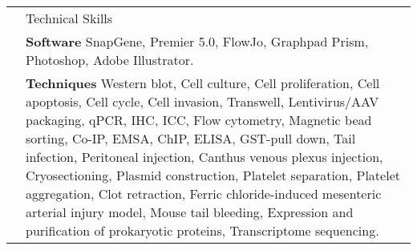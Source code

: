 \documentclass[letterpaper, 11pt]{article}
\newcommand{\headingfont}{\Large\color{LimeGreen}}
\newenvironment{SectionTable}[1]{
	\renewcommand*{\arraystretch}{1.7}
	\setlength{\tabcolsep}{10pt}
	\begin{longtable}{Rp{5.2in}} & #1 \\}
{\end{longtable}\vspace{-.3cm}}
\begin{document}
\begin{SectionTable}{\headingfont Technical Skills}

& \textbf{Software} \newline
SnapGene, Premier 5.0, FlowJo, Graphpad Prism, Photoshop, Adobe Illustrator.\\

& \textbf{Techniques} \newline
Western blot, Cell culture, Cell proliferation, Cell apoptosis, Cell cycle, Cell invasion, Transwell, Lentivirus/AAV packaging, qPCR, IHC, ICC, Flow cytometry, Magnetic bead sorting, Co-IP, EMSA, ChIP, ELISA, GST-pull down, Tail infection, Peritoneal injection, Canthus venous plexus injection, Cryosectioning, Plasmid construction, Platelet separation, Platelet aggregation, Clot retraction, Ferric chloride-induced mesenteric arterial injury model, Mouse tail bleeding, Expression and purification of prokaryotic proteins, Transcriptome sequencing. \\
\end{SectionTable}

\end{document}

